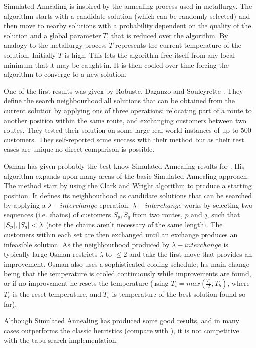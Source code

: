Simulated Annealing is inspired by the annealing process used in metallurgy. The algorithm starts with a candidate solution (which can be randomly selected) and then move to nearby solutions with a probability dependent on the quality of the solution and a global parameter $T$, that is reduced over the algorithm. By analogy to the metallurgy process $T$ represents the current temperature of the solution. Initially $T$ is high. This lets the algorithm free itself from any local minimum that it may be caught in. It is then cooled over time forcing the algorithm to converge to a new solution. 

One of the first results was given by Robuste, Daganzo and Souleyrette \cite{RDS:1990}. They define the search neighbourhood all solutions that can be obtained from the current solution by applying one of three operations: relocating part of a route to another position within the same route, and exchanging customers between two routes. They tested their solution on some large real-world instances of up to 500 customers. They self-reported some success with their method but as their test cases are unique no direct comparison is possible. 

Osman has given probably the best know Simulated Annealing results for \VRP \cite{Osman:1993}. His algorithm expands upon many areas of the basic Simulated Annealing approach. The method start by using the Clark and Wright algorithm to produce a starting position. It defines its neighbourhood as candidate solutions that can be searched by applying a $\lambda-interchange$ operation. $\lambda-interchange$ works by selecting two sequences (i.e. chains) of customers $S_p, S_q$ from two routes, $p$ and $q$, such that $|S_p|, |S_q| < \lambda$ (note the chains aren't necessary of the same length). The customers within each set are then exchanged until an exchange produces an infeasible solution. As the neighbourhood produced by $\lambda-interchange$ is typically large Osman restricts $\lambda$ to $\le 2$ and take the first move that provides an improvement. Osman also uses a sophisticated cooling schedule; his main change being that the temperature is cooled continuously while improvements are found, or if no improvement he resets the temperature (using $T_i = max(\frac{T_r}{2}, T_b)$, where $T_r$ is the reset temperature, and $T_b$ is temperature of the best solution found so far).

Although Simulated Annealing has produced some good results, and in many cases outperforms the classic heuristics (compare \cite{Laporte:1999} with \cite{GLP:1999}), it is not competitive with the tabu search implementation. 

